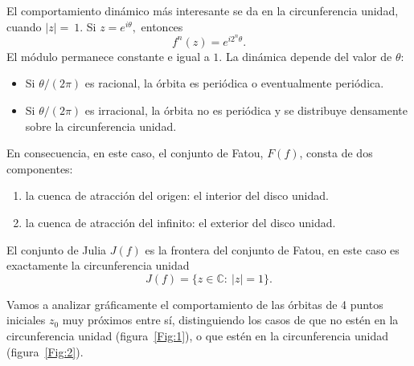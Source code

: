 \documentclass[11pt,a4paper]{article}
\begin{document}
 El comportamiento dinámico más interesante se da en la circunferencia unidad, cuando $|z|=~1$. Si $z=e^{i\theta},$ entonces \[ f^n(z)=e^{i2^n\theta}. \] El módulo permanece constante e igual a \(1\). La dinámica depende del valor de \(\theta\): 
 \begin{itemize} 
 \item Si \(\theta/(2\pi)\) es racional, la órbita es periódica o eventualmente periódica. 
 \item Si \(\theta/(2\pi)\) es irracional, la órbita no es periódica y se distribuye densamente sobre la circunferencia unidad. 
 \end{itemize} 
 
 En consecuencia, en este caso, el conjunto de Fatou, \(F(f)\), consta de dos componentes: 
 \begin{enumerate} 
 \item la cuenca de atracción del origen: el interior del disco unidad.
 \item la cuenca de atracción del infinito: el exterior del disco unidad.
 \end{enumerate} 
 
 El conjunto de Julia \(J(f)\) es la frontera del conjunto de Fatou, en este caso es exactamente la circunferencia unidad
  \[ J(f)=\{z\in\mathbb C:\ |z|=1\}. \] 
  
  Vamos a analizar gráficamente el comportamiento de  las órbitas de 4 puntos iniciales $z_0$ muy próximos entre sí, distinguiendo los casos de que no estén en la circunferencia unidad (figura~\ref{Fig:1}), o que estén en la circunferencia unidad (figura~\ref{Fig:2}).
  
\end{document}
